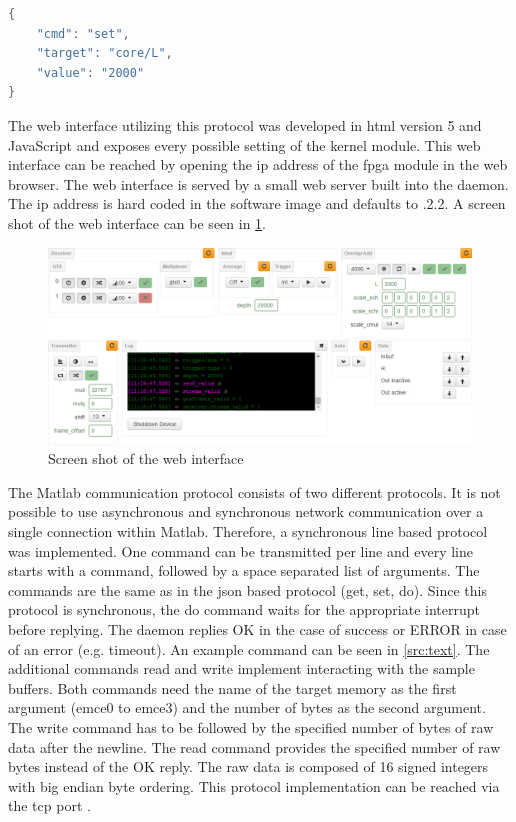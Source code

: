 \documentclass[12pt,a4paper,parskip=full,abstract=true,BCOR=12mm]{scrreprt}
\newcommand{\hack}{}
\begin{document}
\begin{lstlisting}[language=Java,float=htb,caption={Example \gls{json} formated packet to set $\gls{L}=2000$},label=src:json,basicstyle=\hack\scriptsize]
{
    "cmd": "set",
    "target": "core/L",
    "value": "2000"
}
\end{lstlisting}

The web interface utilizing this protocol was developed in \gls{html} version 5 and JavaScript and exposes
every possible setting of the kernel module. This web interface can be reached
by opening the \gls{ip} address of the \gls{fpga} module in the web browser. The
web interface is served by a small web server built into the daemon. The \gls{ip}
address is hard coded in the software image and defaults to {.2.2}.
A screen shot of the web interface can be seen in \cref{fig:webinterface}.

\begin{figure}[htb]
    \centering
    \includegraphics[width=\textwidth]{webinterface}
    \caption{Screen shot of the web interface}
    \label{fig:webinterface}
\end{figure}

The Matlab communication protocol consists of two different protocols. It is not
possible to use asynchronous and synchronous network communication over a single
connection within Matlab. Therefore, a synchronous line based protocol was implemented.
One command can be transmitted per line and every line starts with a command, followed
by a space separated list of arguments. The commands are the same as in the \gls{json}
based protocol ({\ttfamily get}, {\ttfamily set}, {\ttfamily do}). Since this protocol is synchronous, the
{\ttfamily do} command waits for the appropriate interrupt before replying. The daemon replies
{\ttfamily OK} in the case of success or {\ttfamily ERROR} in case of an error (e.g. timeout). An example
command can be seen in \cref{src:text}. The additional commands {\ttfamily read} and {\ttfamily write}
implement interacting with the sample buffers. Both commands need the name of the target memory as
the first argument ({\ttfamily emce0} to {\ttfamily emce3}) and the number of bytes as the second
argument. The {\ttfamily write} command has to be followed by the specified number of bytes of raw data after the
newline. The {\ttfamily read} command provides the specified number of raw bytes instead of the {\ttfamily OK} reply.
The raw data is composed of \SI{16}{\bit} signed integers with big endian byte ordering. This protocol implementation
can be reached via the \gls{tcp} port {}.
\end{document}
